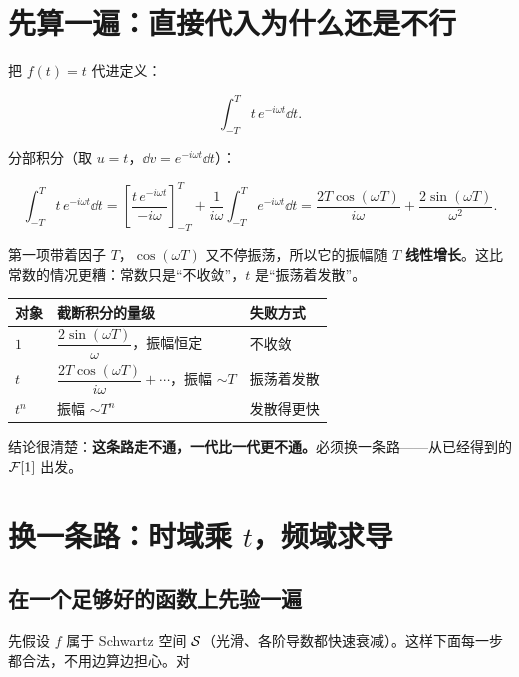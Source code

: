 \section{先算一遍：直接代入为什么还是不行}

把 $f(t)=t$ 代进定义：

\begin{equation}
\int_{-T}^{T}t\,e^{-i\omega t}\dd t .
\end{equation}

分部积分（取 $u=t$，$\dd v=e^{-i\omega t}\dd t$）：

\begin{equation}
\int_{-T}^{T}t\,e^{-i\omega t}\dd t
=\left[\frac{t\,e^{-i\omega t}}{-i\omega}\right]_{-T}^{T}
+\frac{1}{i\omega}\int_{-T}^{T}e^{-i\omega t}\dd t
=\frac{2T\cos(\omega T)}{i\omega}+\frac{2\sin(\omega T)}{\omega^{2}} .
\end{equation}

第一项带着因子 $T$，$\cos(\omega T)$ 又不停振荡，所以它的振幅随 $T$ \textbf{线性增长}。这比常数的情况更糟：常数只是“不收敛”，$t$ 是“振荡着发散”。

\begin{center}
\small
\renewcommand{\arraystretch}{1.3}
\begin{tabularx}{\textwidth}{@{}p{2.2cm}L{5.0cm}Y@{}}
\toprule
对象 & 截断积分的量级 & 失败方式 \\
\midrule
$1$ & $\dfrac{2\sin(\omega T)}{\omega}$，振幅恒定 & 不收敛 \\
$t$ & $\dfrac{2T\cos(\omega T)}{i\omega}+\cdots$，振幅 $\sim T$ & 振荡着发散 \\
$t^{n}$ & 振幅 $\sim T^{n}$ & 发散得更快 \\
\bottomrule
\end{tabularx}
\end{center}

结论很清楚：\textbf{这条路走不通，一代比一代更不通。}必须换一条路——从已经得到的 $\mathcal{F}[1]$ 出发。

\section{换一条路：时域乘 $t$，频域求导}

\subsection{在一个足够好的函数上先验一遍}

先假设 $f$ 属于 Schwartz 空间 $\mathcal{S}$（光滑、各阶导数都快速衰减）。这样下面每一步都合法，不用边算边担心。对

